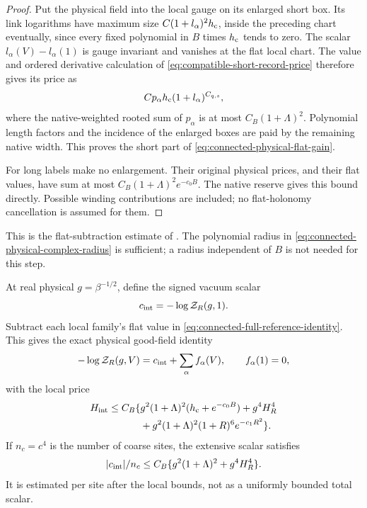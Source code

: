\documentclass[11pt,reqno]{amsart}
\numberwithin{equation}{section}
\theoremstyle{definition}
\theoremstyle{remark}
\begin{document}
\begin{proof}
Put the physical field into the local
gauge on its enlarged short box.
Its link logarithms have maximum
size \(C(1+l_\alpha)^2h_{\rm c}\),
inside the preceding chart eventually,
since every fixed polynomial in \(B\)
times \(h_{\rm c}\) tends to zero.
The scalar \(l_\alpha(V)-l_\alpha(1)\)
is gauge invariant and vanishes at the
flat local chart.
The value and ordered derivative
calculation of
\eqref{eq:compatible-short-record-price}
therefore gives its price as
\[
                   Cp_\alpha h_{\rm c}
                                      (1+l_\alpha)^{C_{q,s}},
\]
where the native-weighted rooted sum
of \(p_\alpha\) is at most
\(C_B(1+\Lambda)^2\).
Polynomial length factors and the
incidence of the enlarged boxes are
paid by the remaining native width.
This proves the short part of
\eqref{eq:connected-physical-flat-gain}.

For long labels make no enlargement.
Their original physical prices, and
their flat values, have sum at most
\(C_B(1+\Lambda)^2e^{-c_0B}\).
The native reserve gives this bound
directly. Possible winding contributions
are included; no flat-holonomy
cancellation is assumed for them.
\end{proof}

This is the flat-subtraction estimate
of \cite[Lemma~26.2, pp.~140--141]{Main}.
The polynomial radius in
\eqref{eq:connected-physical-complex-radius}
is sufficient; a radius independent
of \(B\) is not needed for this step.

At real physical \(g=\beta^{-1/2}\),
define the signed vacuum scalar
\[
                         c_{\rm int}=-\log\mathcal Z_R(g,1).
\]
Subtract each local family's flat
value in \eqref{eq:connected-full-reference-identity}.
This gives the exact physical good-field
identity
\begin{equation}
          -\log\mathcal Z_R(g,V)
                   =c_{\rm int}+\sum_\alpha f_\alpha(V),
                   \qquad f_\alpha(1)=0 ,
 \label{eq:connected-physical-vacuum-identity}
\end{equation}
with the local price
\begin{equation}
 \begin{split}
 H_{\rm int}\le C_B\{&
     g^2(1+\Lambda)^2(h_{\rm c}+e^{-c_0B})
             +g^4H_R^4\\
     &+g^2(1+\Lambda)^2(1+R)^6e^{-c_1R^2}\}.
 \end{split}
 \label{eq:connected-physical-nonconstant-price}
\end{equation}
If \(n_c=c^4\) is the number of coarse
sites, the extensive scalar satisfies
\[
       |c_{\rm int}|/n_c
                \le C_B\{g^2(1+\Lambda)^2+g^4H_R^4\}.
\]
It is estimated per site after the
local bounds, not as a uniformly
bounded total scalar.
\end{document}
